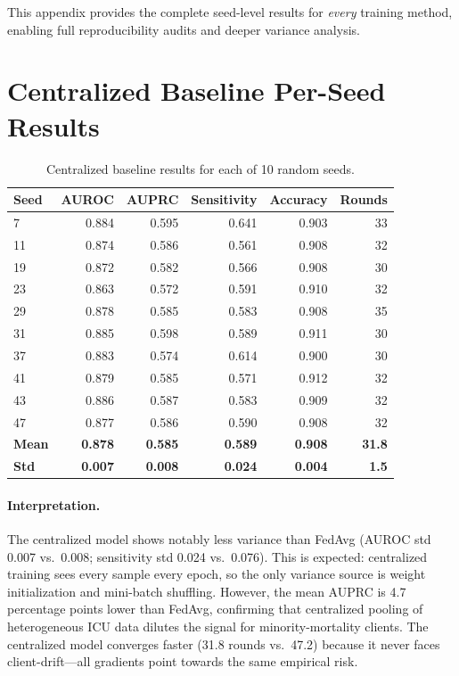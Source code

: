 \documentclass[11pt,a4paper]{report}
\begin{document}
This appendix provides the complete seed-level results for \emph{every} training method, enabling full reproducibility audits and deeper variance analysis.

\section{Centralized Baseline Per-Seed Results}

\begin{longtable}{lrrrrr}
\caption{Centralized baseline results for each of 10 random seeds.} \label{tab:cent_seeds} \\
\toprule
\textbf{Seed} & \textbf{AUROC} & \textbf{AUPRC} & \textbf{Sensitivity} & \textbf{Accuracy} & \textbf{Rounds} \\
\midrule
\endhead
7 & 0.884 & 0.595 & 0.641 & 0.903 & 33 \\
11 & 0.874 & 0.586 & 0.561 & 0.908 & 32 \\
19 & 0.872 & 0.582 & 0.566 & 0.908 & 30 \\
23 & 0.863 & 0.572 & 0.591 & 0.910 & 32 \\
29 & 0.878 & 0.585 & 0.583 & 0.908 & 35 \\
31 & 0.885 & 0.598 & 0.589 & 0.911 & 30 \\
37 & 0.883 & 0.574 & 0.614 & 0.900 & 30 \\
41 & 0.879 & 0.585 & 0.571 & 0.912 & 32 \\
43 & 0.886 & 0.587 & 0.583 & 0.909 & 32 \\
47 & 0.877 & 0.586 & 0.590 & 0.908 & 32 \\
\midrule
\textbf{Mean} & \textbf{0.878} & \textbf{0.585} & \textbf{0.589} & \textbf{0.908} & \textbf{31.8} \\
\textbf{Std} & \textbf{0.007} & \textbf{0.008} & \textbf{0.024} & \textbf{0.004} & \textbf{1.5} \\
\bottomrule
\end{longtable}

\paragraph{Interpretation.} The centralized model shows notably less variance than FedAvg (AUROC std 0.007 vs.\ 0.008; sensitivity std 0.024 vs.\ 0.076). This is expected: centralized training sees every sample every epoch, so the only variance source is weight initialization and mini-batch shuffling. However, the mean AUPRC is 4.7 percentage points lower than FedAvg, confirming that centralized pooling of heterogeneous ICU data dilutes the signal for minority-mortality clients. The centralized model converges faster (31.8 rounds vs.\ 47.2) because it never faces client-drift---all gradients point towards the same empirical risk.
\end{document}
